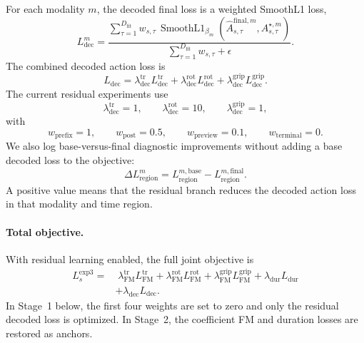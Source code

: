 \documentclass[10pt,twocolumn,letterpaper]{article}
\begin{document}
For each modality $m$, the decoded final loss is a weighted SmoothL1 loss,
\begin{equation}
L_{\mathrm{dec}}^{m}
=
\frac{
\sum_{\tau=1}^{D_{\mathrm{fit}}}
 w_{s,\tau}\,
 \operatorname{SmoothL1}_{\beta_m}
 \left(
 \hat A_{s,\tau}^{\mathrm{final},m},
 A_{s,\tau}^{\star,m}
 \right)
}{
\sum_{\tau=1}^{D_{\mathrm{fit}}}w_{s,\tau}+\epsilon
}.
\end{equation}
The combined decoded action loss is
\begin{equation}
L_{\mathrm{dec}}
=
\lambda_{\mathrm{dec}}^{\mathrm{tr}}L_{\mathrm{dec}}^{\mathrm{tr}}
+
\lambda_{\mathrm{dec}}^{\mathrm{rot}}L_{\mathrm{dec}}^{\mathrm{rot}}
+
\lambda_{\mathrm{dec}}^{\mathrm{grip}}L_{\mathrm{dec}}^{\mathrm{grip}}.
\end{equation}
The current residual experiments use
\begin{equation}
\lambda_{\mathrm{dec}}^{\mathrm{tr}}=1,
\qquad
\lambda_{\mathrm{dec}}^{\mathrm{rot}}=10,
\qquad
\lambda_{\mathrm{dec}}^{\mathrm{grip}}=1,
\end{equation}
with
\begin{equation}
w_{\mathrm{prefix}}=1,
\qquad
w_{\mathrm{post}}=0.5,
\qquad
w_{\mathrm{preview}}=0.1,
\qquad
w_{\mathrm{terminal}}=0.
\end{equation}
We also log base-versus-final diagnostic improvements without adding a base decoded loss to the objective:
\begin{equation}
\Delta L^{m}_{\mathrm{region}}
=
L^{m,\mathrm{base}}_{\mathrm{region}}
-
L^{m,\mathrm{final}}_{\mathrm{region}}.
\end{equation}
A positive value means that the residual branch reduces the decoded action loss in that modality and time region.

\paragraph{Total objective.}
With residual learning enabled, the full joint objective is
\begin{align}
L_s^{\mathrm{exp3}}=
&\;\lambda_{\mathrm{FM}}^{\mathrm{tr}}L_{\mathrm{FM}}^{\mathrm{tr}}
+\lambda_{\mathrm{FM}}^{\mathrm{rot}}L_{\mathrm{FM}}^{\mathrm{rot}}
+\lambda_{\mathrm{FM}}^{\mathrm{grip}}L_{\mathrm{FM}}^{\mathrm{grip}}
+\lambda_{\mathrm{dur}}L_{\mathrm{dur}} \nonumber\\
&+\lambda_{\mathrm{dec}} L_{\mathrm{dec}}.
\end{align}
In Stage~1 below, the first four weights are set to zero and only the residual decoded loss is optimized. In Stage~2, the coefficient FM and duration losses are restored as anchors.
\end{document}
